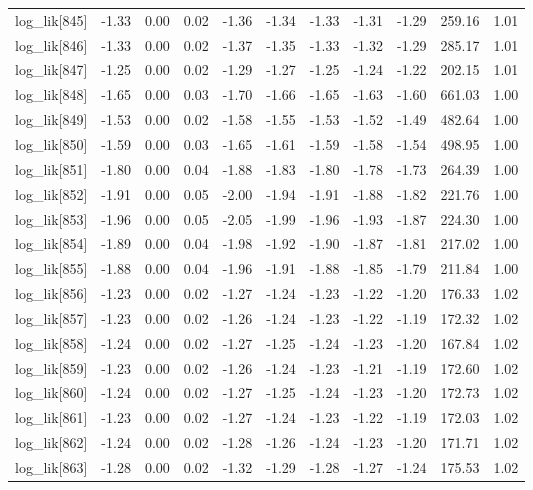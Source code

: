 \begin{table}[ht]
\begin{tabular}{rrrrrrrrrrr}
  log\_lik[845] & -1.33 & 0.00 & 0.02 & -1.36 & -1.34 & -1.33 & -1.31 & -1.29 & 259.16 & 1.01 \\ 
  log\_lik[846] & -1.33 & 0.00 & 0.02 & -1.37 & -1.35 & -1.33 & -1.32 & -1.29 & 285.17 & 1.01 \\ 
  log\_lik[847] & -1.25 & 0.00 & 0.02 & -1.29 & -1.27 & -1.25 & -1.24 & -1.22 & 202.15 & 1.01 \\ 
  log\_lik[848] & -1.65 & 0.00 & 0.03 & -1.70 & -1.66 & -1.65 & -1.63 & -1.60 & 661.03 & 1.00 \\ 
  log\_lik[849] & -1.53 & 0.00 & 0.02 & -1.58 & -1.55 & -1.53 & -1.52 & -1.49 & 482.64 & 1.00 \\ 
  log\_lik[850] & -1.59 & 0.00 & 0.03 & -1.65 & -1.61 & -1.59 & -1.58 & -1.54 & 498.95 & 1.00 \\ 
  log\_lik[851] & -1.80 & 0.00 & 0.04 & -1.88 & -1.83 & -1.80 & -1.78 & -1.73 & 264.39 & 1.00 \\ 
  log\_lik[852] & -1.91 & 0.00 & 0.05 & -2.00 & -1.94 & -1.91 & -1.88 & -1.82 & 221.76 & 1.00 \\ 
  log\_lik[853] & -1.96 & 0.00 & 0.05 & -2.05 & -1.99 & -1.96 & -1.93 & -1.87 & 224.30 & 1.00 \\ 
  log\_lik[854] & -1.89 & 0.00 & 0.04 & -1.98 & -1.92 & -1.90 & -1.87 & -1.81 & 217.02 & 1.00 \\ 
  log\_lik[855] & -1.88 & 0.00 & 0.04 & -1.96 & -1.91 & -1.88 & -1.85 & -1.79 & 211.84 & 1.00 \\ 
  log\_lik[856] & -1.23 & 0.00 & 0.02 & -1.27 & -1.24 & -1.23 & -1.22 & -1.20 & 176.33 & 1.02 \\ 
  log\_lik[857] & -1.23 & 0.00 & 0.02 & -1.26 & -1.24 & -1.23 & -1.22 & -1.19 & 172.32 & 1.02 \\ 
  log\_lik[858] & -1.24 & 0.00 & 0.02 & -1.27 & -1.25 & -1.24 & -1.23 & -1.20 & 167.84 & 1.02 \\ 
  log\_lik[859] & -1.23 & 0.00 & 0.02 & -1.26 & -1.24 & -1.23 & -1.21 & -1.19 & 172.60 & 1.02 \\ 
  log\_lik[860] & -1.24 & 0.00 & 0.02 & -1.27 & -1.25 & -1.24 & -1.23 & -1.20 & 172.73 & 1.02 \\ 
  log\_lik[861] & -1.23 & 0.00 & 0.02 & -1.27 & -1.24 & -1.23 & -1.22 & -1.19 & 172.03 & 1.02 \\ 
  log\_lik[862] & -1.24 & 0.00 & 0.02 & -1.28 & -1.26 & -1.24 & -1.23 & -1.20 & 171.71 & 1.02 \\ 
  log\_lik[863] & -1.28 & 0.00 & 0.02 & -1.32 & -1.29 & -1.28 & -1.27 & -1.24 & 175.53 & 1.02 \\ 

\end{tabular}
\end{table}
